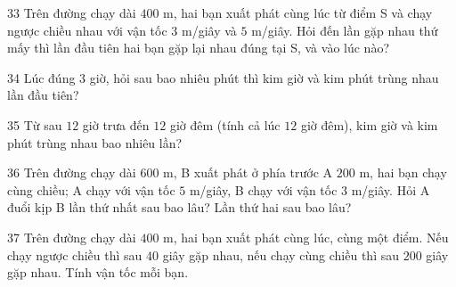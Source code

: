 \gap
\begin{probbox}{33}{}
Trên đường chạy dài $400$ m, hai bạn xuất phát cùng lúc từ điểm S và chạy ngược chiều nhau với vận tốc $3$ m/giây và $5$ m/giây. Hỏi đến lần gặp nhau thứ mấy thì lần đầu tiên hai bạn gặp lại nhau đúng tại S, và vào lúc nào?
\end{probbox}
\gap
\begin{probbox}{34}{}
Lúc đúng $3$ giờ, hỏi sau bao nhiêu phút thì kim giờ và kim phút trùng nhau lần đầu tiên?
\end{probbox}
\gap
\begin{probbox}{35}{}
Từ sau $12$ giờ trưa đến $12$ giờ đêm (tính cả lúc $12$ giờ đêm), kim giờ và kim phút trùng nhau bao nhiêu lần?
\end{probbox}
\gap
\begin{probbox}{36}{}
Trên đường chạy dài $600$ m, B xuất phát ở phía trước A $200$ m, hai bạn chạy cùng chiều; A chạy với vận tốc $5$ m/giây, B chạy với vận tốc $3$ m/giây. Hỏi A đuổi kịp B lần thứ nhất sau bao lâu? Lần thứ hai sau bao lâu?
\end{probbox}
\gap
\begin{probbox}{37}{}
Trên đường chạy dài $400$ m, hai bạn xuất phát cùng lúc, cùng một điểm. Nếu chạy ngược chiều thì sau $40$ giây gặp nhau, nếu chạy cùng chiều thì sau $200$ giây gặp nhau. Tính vận tốc mỗi bạn.
\end{probbox}
